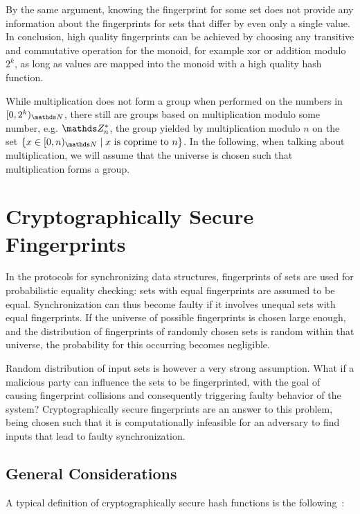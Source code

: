 By the same argument, knowing the fingerprint for some set does not provide any information about the fingerprints for sets that differ by even only a single value. In conclusion, high quality fingerprints can be achieved by choosing any transitive and commutative operation for the monoid, for example xor or addition modulo $2^k$, as long as values are mapped into the monoid with a high quality hash function.

While multiplication does not form a group when performed on the numbers in $\interval{0}{2^k}{\N}$, there still are groups based on multiplication modulo some number, e.g. $\Z_n^\ast$, the group yielded by multiplication modulo $n$ on the set $\set{x \in \interval{0}{n}{\N} \mid \text{$x$ is coprime to $n$}}$. In the following, when talking about multiplication, we will assume that the universe is chosen such that multiplication forms a group.

\section{Cryptographically Secure Fingerprints}
\label{crypto}

In the protocols for synchronizing data structures, fingerprints of sets are used for probabilistic equality checking: sets with equal fingerprints are assumed to be equal. Synchronization can thus become faulty if it involves unequal sets with equal fingerprints. If the universe of possible fingerprints is chosen large enough, and the distribution of fingerprints of randomly chosen sets is random within that universe, the probability for this occurring becomes negligible.

Random distribution of input sets is however a very strong assumption. What if a malicious party can influence the sets to be fingerprinted, with the goal of causing fingerprint collisions and consequently triggering faulty behavior of the system? Cryptographically secure fingerprints are an answer to this problem, being chosen such that it is computationally infeasible for an adversary to find inputs that lead to faulty synchronization.

\subsection{General Considerations}

A typical definition of cryptographically secure hash functions is the following~\cite{menezes2018handbook}:


